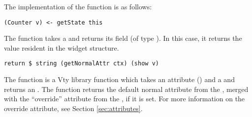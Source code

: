 The implementation of the  function is as follows:

\begin{verbatim}
(Counter v) <- getState this
\end{verbatim}

The  function takes a  and returns its
 field (of type ).  In this case, it returns the
 value resident in the widget structure.

\begin{verbatim}
return $ string (getNormalAttr ctx) (show v)
\end{verbatim}

The  function is a Vty library function which takes an
attribute () and a  and returns an .
The  function returns the default normal attribute
from the , merged with the ``override'' attribute
from the , if it is set.  For more information on
the override attribute, see Section \vref{sec:attributes}.
